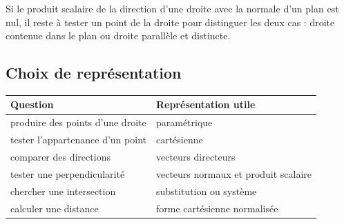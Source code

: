\begin{connectionbox}
Si le produit scalaire de la direction d'une droite avec la normale d'un plan est nul, il reste à tester un point de la droite pour distinguer les deux cas : droite contenue dans le plan ou droite parallèle et distincte.
\end{connectionbox}

\subsection{Choix de représentation}

\begin{center}
\begin{tabularx}{\textwidth}{@{}lY@{}}
\toprule
Question & Représentation utile\\\midrule
produire des points d'une droite & paramétrique\\
tester l'appartenance d'un point & cartésienne\\
comparer des directions & vecteurs directeurs\\
tester une perpendicularité & vecteurs normaux et produit scalaire\\
chercher une intersection & substitution ou système\\
calculer une distance & forme cartésienne normalisée\\
\bottomrule
\end{tabularx}
\end{center}
